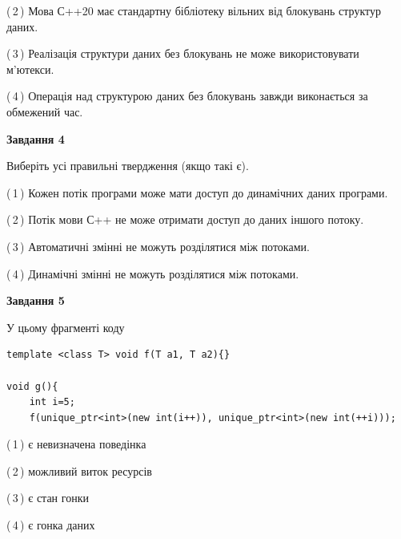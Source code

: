 \documentclass[12pt, ukrainian]{article}
\begin{document}
\begin {large}
{(\,2\,) Мова С++20 має стандартну бібліотеку вільних від блокувань структур даних.%

(\,3\,) Реалізація структури даних без блокувань не може використовувати м’ютекси.%

(\,4\,) Операція над структурою даних без блокувань завжди виконається за обмежений час.%



\begin{center}
\textbf{Завдання 4}
\end{center}
Виберіть усі правильні твердження (якщо такі є).\par
\vspace{2mm}

(\,1\,) Кожен потік програми може мати доступ до динамічних даних програми.%

(\,2\,) Потік мови С++ не може отримати доступ до даних іншого потоку.%

(\,3\,) Автоматичні змінні не можуть розділятися між потоками.%

(\,4\,) Динамічні змінні не можуть розділятися між потоками.%



\begin{center}
\textbf{Завдання 5}
\end{center}
У цьому фрагменті коду
\begin{verbatim}
template <class T> void f(T a1, T a2){}

void g(){
    int i=5;
    f(unique_ptr<int>(new int(i++)), unique_ptr<int>(new int(++i)));
\end{verbatim}

(\,1\,) є невизначена поведінка%

(\,2\,) можливий виток ресурсів%

(\,3\,) є стан гонки%

(\,4\,) є гонка даних%


}
\end {large}
\end{document}
